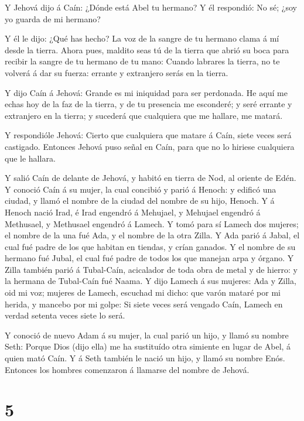  Y Jehová dijo á Caín: ¿Dónde está Abel tu hermano? Y él
respondió: No sé; ¿soy yo guarda de mi hermano?

 Y él le dijo: ¿Qué has hecho? La voz de la sangre de tu
hermano clama á mí desde la tierra.  Ahora pues, maldito
seas tú de la tierra que abrió su boca para recibir la sangre de tu
hermano de tu mano:  Cuando labrares la tierra, no te
volverá á dar su fuerza: errante y extranjero serás en la tierra.

 Y dijo Caín á Jehová: Grande es mi iniquidad para ser
perdonada.  He aquí me echas hoy de la faz de la tierra, y
de tu presencia me esconderé; y seré errante y extranjero en la tierra;
y sucederá que cualquiera que me hallare, me matará.

 Y respondióle Jehová: Cierto que cualquiera que matare á
Caín, siete veces será castigado. Entonces Jehová puso señal en Caín,
para que no lo hiriese cualquiera que le hallara.

 Y salió Caín de delante de Jehová, y habitó en tierra de
Nod, al oriente de Edén.  Y conoció Caín á su mujer, la
cual concibió y parió á Henoch: y edificó una ciudad, y llamó el nombre
de la ciudad del nombre de su hijo, Henoch.  Y á Henoch
nació Irad, é Irad engendró á Mehujael, y Mehujael engendró á Methusael,
y Methusael engendró á Lamech.  Y tomó para sí Lamech dos
mujeres; el nombre de la una fué Ada, y el nombre de la otra Zilla.
 Y Ada parió á Jabal, el cual fué padre de los que habitan
en tiendas, y crían ganados.  Y el nombre de su hermano fué
Jubal, el cual fué padre de todos los que manejan arpa y órgano.
 Y Zilla también parió á Tubal-Caín, acicalador de toda
obra de metal y de hierro: y la hermana de Tubal-Caín fué Naama.
 Y dijo Lamech á sus mujeres: Ada y Zilla, oid mi voz;
mujeres de Lamech, escuchad mi dicho: que varón mataré por mi herida, y
mancebo por mi golpe:  Si siete veces será vengado Caín,
Lamech en verdad setenta veces siete lo será.

 Y conoció de nuevo Adam á su mujer, la cual parió un hijo,
y llamó su nombre Seth: Porque Dios (dijo ella) me ha sustituído otra
simiente en lugar de Abel, á quien mató Caín.  Y á Seth
también le nació un hijo, y llamó su nombre Enós. Entonces los hombres
comenzaron á llamarse del nombre de Jehová.

\hypertarget{section-4}{%
\section{5}\label{section-4}}

